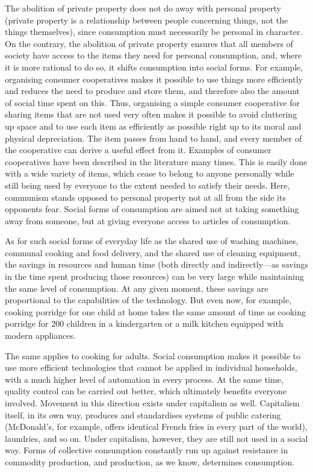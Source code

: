 \documentclass[12pt,a4paper,openany]{book}
\begin{document}
The abolition of private property does not do away with personal property (private property is a relationship between people concerning things, not the things themselves), since consumption must necessarily be personal in character. On the contrary, the abolition of private property ensures that all members of society have access to the items they need for personal consumption, and, where it is more rational to do so, it shifts consumption into social forms. For example, organising consumer cooperatives makes it possible to use things more efficiently and reduces the need to produce and store them, and therefore also the amount of social time spent on this. Thus, organising a simple consumer cooperative for sharing items that are not used very often makes it possible to avoid cluttering up space and to use each item as efficiently as possible right up to its moral and physical depreciation. The item passes from hand to hand, and every member of the cooperative can derive a useful effect from it. Examples of consumer cooperatives have been described in the literature many times. This is easily done with a wide variety of items, which cease to belong to anyone personally while still being used by everyone to the extent needed to satisfy their needs. Here, communism stands opposed to personal property not at all from the side its opponents fear. Social forms of consumption are aimed not at taking something away from someone, but at giving everyone access to articles of consumption.

As for such social forms of everyday life as the shared use of washing machines, communal cooking and food delivery, and the shared use of cleaning equipment, the savings in resources and human time (both directly and indirectly—as savings in the time spent producing those resources) can be very large while maintaining the same level of consumption. At any given moment, these savings are proportional to the capabilities of the technology. But even now, for example, cooking porridge for one child at home takes the same amount of time as cooking porridge for 200 children in a kindergarten or a milk kitchen equipped with modern appliances.

The same applies to cooking for adults. Social consumption makes it possible to use more efficient technologies that cannot be applied in individual households, with a much higher level of automation in every process. At the same time, quality control can be carried out better, which ultimately benefits everyone involved. Movement in this direction exists under capitalism as well. Capitalism itself, in its own way, produces and standardises systems of public catering (McDonald's, for example, offers identical French fries in every part of the world), laundries, and so on. Under capitalism, however, they are still not used in a social way. Forms of collective consumption constantly run up against resistance in commodity production, and production, as we know, determines consumption.
\end{document}

